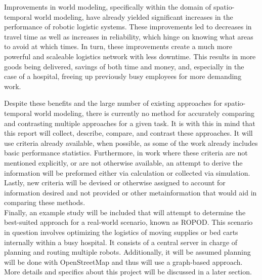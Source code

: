   Improvements in world modeling, specifically within the domain of
  spatio-temporal world modeling, have already yielded significant increases
  in the performance of robotic logistic systems. These improvements led to
  decreases in travel time as well as increases in reliability, which hinge
  on knowing what areas to avoid at which times. In turn, these improvements
  create a much more powerful and scaleable logistics network with less
  downtime. This results in more goods being delivered, savings of
  both time and money, and, especially in the case of a hospital,
  freeing up previously busy employees for more demanding work.

  Despite these benefits and the large number of existing approaches
  for spatio-temporal world modeling, there is currently no method for
  accurately comparing and contrasting multiple approaches for a given task.
  It is with this
  in mind that this report will collect, describe, compare, and contrast these
  approaches. It will use criteria already available, when possible, as some
  of the work already includes basic performance statistics.
  Furthermore, in work where these criteria are not mentioned explicitly, or are
  not otherwise available, an attempt to derive the information will be
  preformed either via
  calculation or collected via simulation. Lastly, new criteria will be devised
  or otherwise assigned to account for information desired and not provided
  or other metainformation that would aid in comparing these methods. \\

  Finally, an example study will be included that will attempt to determine the
  best-suited approach for a real-world scenario, known as ROPOD. This
  scenario in question involves optimizing the logistics of moving
  supplies or bed carts internally within a busy hospital.
  It consists of a central server in charge of planning and routing multiple
  robots. Additionally, it will be assumed planning will be done with
  OpenStreetMap and thus will use a graph-based approach. More details and
  specifics about this project will be discussed in a later section. \\


